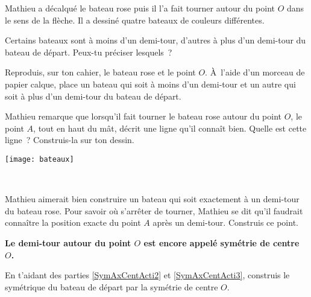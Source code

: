 \begin{activite}

Mathieu a décalqué le bateau rose puis il l'a fait tourner autour du point $O$ dans le sens de la flèche. Il a dessiné quatre bateaux de couleurs différentes.

\vspace{1em}

\begin{minipage}[c]{0.42\linewidth}
\begin{partie}
Certains bateaux sont à moins d'un demi-tour, d'autres à plus d'un demi-tour du bateau de départ. Peux-tu préciser lesquels ?
\end{partie}

\begin{partie}
Reproduis, sur ton cahier, le bateau rose et le point $O$. À l'aide d'un morceau de papier calque, place un bateau qui soit à moins d'un demi-tour et un autre qui soit à plus d'un demi-tour du bateau de départ.
\end{partie}

\begin{partie} \label{SymAxCentActi2}
Mathieu remarque que lorsqu'il fait tourner le bateau rose autour du point $O$, le point $A$, tout en haut du mât, décrit une ligne qu'il connaît bien. Quelle est cette ligne ? Construis-la sur ton dessin.
\end{partie}
 \end{minipage}
   \quad \begin{minipage}[c]{0.36\linewidth}
  \texttt{[image: bateaux]}
  \end{minipage} \\

\begin{partie} \label{SymAxCentActi3}
Mathieu aimerait bien construire un bateau qui soit exactement à un demi-tour du bateau rose. Pour savoir où s'arrêter de tourner, Mathieu se dit qu'il faudrait connaître la position exacte du point $A$ après un demi-tour. Construis ce point.
\begin{center} \textbf{\textcolor{H1}{Le demi-tour autour du point $O$ est encore appelé symétrie de centre $O$.}} \end{center}
\end{partie}

\begin{partie}
En t'aidant des parties \ref{SymAxCentActi2} et \ref{SymAxCentActi3}, construis le symétrique du bateau de départ par la symétrie de centre $O$.
\end{partie}

\end{activite}

